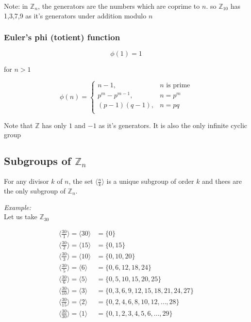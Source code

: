 \documentclass[11pt,letterpaper]{article}
\newenvironment{example}                             
        {\noindent\textit{Example:}\\}
	{}
\begin{document}
Note: in $\mathbb{Z}_n$, the generators are the numbers which are coprime to $n$. so $\mathbb{Z}_{10}$ has 1,3,7,9 as it's generators under addition modulo $n$

\subsubsection{Euler's phi (totient) function}

\[
  \phi(1) = 1
\]

for $n > 1$  

\[
  \phi(n) = \begin{cases}
    n-1, &n \text{ is prime}\\
    p^m - p^{m-1}, &n = p^m\\
    (p-1)(q-1), &n = pq\\
  \end{cases}
\]

\vspace{0.5in}

Note that $\mathbb{Z}$ has only $1$ and $-1$ as it's generators. It is also the only infinite cyclic group

\subsection{Subgroups of $\mathbb{Z}_n$}
For any divisor $k$ of $n$, the set $\langle \frac{n}{k} \rangle$ is a unique subgroup of order $k$ and thees are the only subgroup of $\mathbb{Z}_n$.

\begin{example}
  Let us take $\mathbb{Z}_{30}$

  \begin{align*}
    \langle \frac{30}{1} \rangle = \langle 30 \rangle &= \{ 0 \}\\
    \langle \frac{30}{2} \rangle = \langle 15 \rangle &= \{ 0, 15\}\\
    \langle \frac{30}{3} \rangle = \langle 10 \rangle &= \{ 0, 10, 20 \}\\
    \langle \frac{30}{5} \rangle = \langle 6\rangle &= \{ 0, 6, 12, 18, 24 \}\\
    \langle \frac{30}{6} \rangle = \langle 5\rangle &= \{ 0, 5, 10, 15, 20, 25\}\\
    \langle \frac{30}{10} \rangle = \langle 3 \rangle &= \{ 0, 3, 6, 9, 12, 15, 18, 21, 24, 27\}\\
    \langle \frac{30}{15} \rangle = \langle 2 \rangle &= \{ 0, 2, 4, 6, 8, 10, 12, \dots, 28\}\\
    \langle \frac{30}{30} \rangle = \langle 1 \rangle &= \{ 0, 1, 2, 3 ,4 , 5, 6 , \dots, 29\}\\
  \end{align*}
\end{example}
\end{document}

